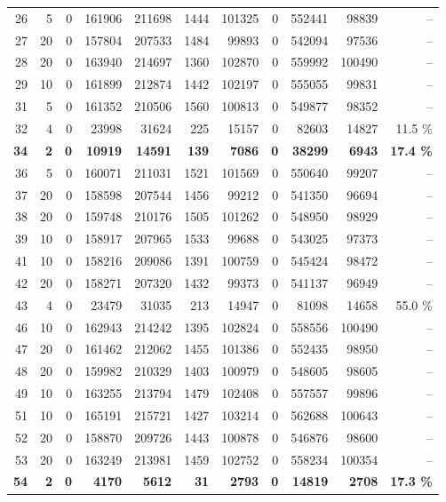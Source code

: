 \documentclass[conference,twoside]{IEEEtran}
\begin{document}
\begin{table}[h]
\begin{tabular}{rrrrrrrrrrr}
26 & 5 & 0  & 161906 & 211698 & 1444  & 101325 & 0  & 552441 & 98839 & --   \\
27 & 20 & 0  & 157804 & 207533 & 1484  & 99893  & 0  & 542094 & 97536 & --   \\
28 & 20 & 0  & 163940 & 214697 & 1360  & 102870 & 0  & 559992 & 100490& --   \\
29 & 10 & 0  & 161899 & 212874 & 1442  & 102197 & 0  & 555055 & 99831 & --   \\
31 & 5 & 0  & 161352 & 210506 & 1560  & 100813 & 0  & 549877 & 98352 & --   \\
32 & 4 & 0  & 23998  & 31624  & 225   & 15157  & 0  & 82603  & 14827 & 11.5 \%   \\
\textbf{34} & \textbf{2} & \textbf{0}  & \textbf{10919}  & \textbf{14591}  & \textbf{139}   & \textbf{7086}   & \textbf{0}  & \textbf{38299}  & \textbf{6943}  & \textbf{17.4 \%}   \\
36 & 5 & 0  & 160071 & 211031 & 1521  & 101569 & 0  & 550640 & 99207 & --   \\
37 & 20 & 0  & 158598 & 207544 & 1456  & 99212  & 0  & 541350 & 96694 & --   \\
38 & 20 & 0  & 159748 & 210176 & 1505  & 101262 & 0  & 548950 & 98929 & --   \\
39 & 10 & 0  & 158917 & 207965 & 1533  & 99688  & 0  & 543025 & 97373 & --   \\
41 & 10 & 0  & 158216 & 209086 & 1391  & 100759 & 0  & 545424 & 98472 & --   \\
42 & 20 & 0  & 158271 & 207320 & 1432  & 99373  & 0  & 541137 & 96949 & --   \\
43 & 4 & 0  & 23479  & 31035  & 213   & 14947  & 0  & 81098  & 14658 & 55.0 \%   \\
46 & 10 & 0  & 162943 & 214242 & 1395  & 102824 & 0  & 558556 & 100490& --   \\
47 & 20 & 0  & 161462 & 212062 & 1455  & 101386 & 0  & 552435 & 98950 & --   \\
48 & 20 & 0  & 159982 & 210329 & 1403  & 100979 & 0  & 548605 & 98605 & --   \\
49 & 10 & 0  & 163255 & 213794 & 1479  & 102408 & 0  & 557557 & 99896 & --   \\
51 & 10 & 0  & 165191 & 215721 & 1427  & 103214 & 0  & 562688 & 100643& --   \\
52 & 20 & 0  & 158870 & 209726 & 1443  & 100878 & 0  & 546876 & 98600 & --   \\
53 & 20 & 0  & 163249 & 213981 & 1459  & 102752 & 0  & 558234 & 100354& --   \\
\textbf{54} & \textbf{2} & \textbf{0}  & \textbf{4170}   & \textbf{5612}   & \textbf{31}    & \textbf{2793}   & \textbf{0}  & \textbf{14819}  & \textbf{2708}  & \textbf{17.3 \%}   \\
\bottomrule
\end{tabular}
\end{table}
\end{document}

